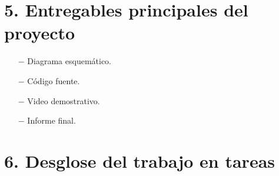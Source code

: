 \documentclass[11pt]{charter}
\begin{document}


\section{5. Entregables principales del proyecto}
\label{sec:entregables}

\begin{itemize}
\item[$-$] Diagrama esquemático.
\item[$-$] Código fuente.
\item[$-$] Video demostrativo.
\item[$-$] Informe final.

\end{itemize}


\clearpage

\section{6. Desglose del trabajo en tareas}
\label{sec:wbs}

\end{document}
